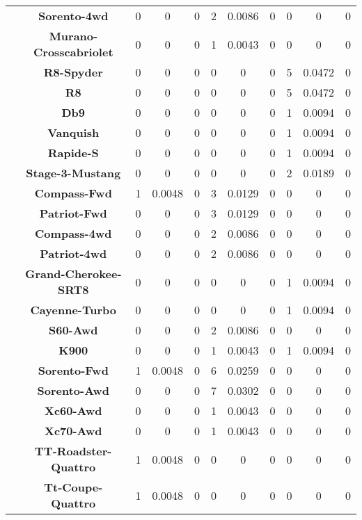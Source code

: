 \begin{center}
\begin{tabular}{|c|c||@{\hspace{1ex}}||c|c|c||@{\hspace{1ex}}||c|c|c||@{\hspace{1ex}}||c|c|c||@{\hspace{1ex}}||}
\cline{2-11}
  & {\bf Sorento-4wd} & 0 & 0 & 0 & 2 & 0.0086 & 0 & 0 & 0 & 0 \\
\cline{2-11}
  & {\bf Murano-Crosscabriolet} & 0 & 0 & 0 & 1 & 0.0043 & 0 & 0 & 0 & 0 \\
\cline{2-11}
  & {\bf R8-Spyder} & 0 & 0 & 0 & 0 & 0 & 0 & 5 & 0.0472 & 0 \\
\cline{2-11}
  & {\bf R8} & 0 & 0 & 0 & 0 & 0 & 0 & 5 & 0.0472 & 0 \\
\cline{2-11}
  & {\bf Db9} & 0 & 0 & 0 & 0 & 0 & 0 & 1 & 0.0094 & 0 \\
\cline{2-11}
  & {\bf Vanquish} & 0 & 0 & 0 & 0 & 0 & 0 & 1 & 0.0094 & 0 \\
\cline{2-11}
  & {\bf Rapide-S} & 0 & 0 & 0 & 0 & 0 & 0 & 1 & 0.0094 & 0 \\
\cline{2-11}
  & {\bf Stage-3-Mustang} & 0 & 0 & 0 & 0 & 0 & 0 & 2 & 0.0189 & 0 \\
\cline{2-11}
  & {\bf Compass-Fwd} & 1 & 0.0048 & 0 & 3 & 0.0129 & 0 & 0 & 0 & 0 \\
\cline{2-11}
  & {\bf Patriot-Fwd} & 0 & 0 & 0 & 3 & 0.0129 & 0 & 0 & 0 & 0 \\
\cline{2-11}
  & {\bf Compass-4wd} & 0 & 0 & 0 & 2 & 0.0086 & 0 & 0 & 0 & 0 \\
\cline{2-11}
  & {\bf Patriot-4wd} & 0 & 0 & 0 & 2 & 0.0086 & 0 & 0 & 0 & 0 \\
\cline{2-11}
  & {\bf Grand-Cherokee-SRT8} & 0 & 0 & 0 & 0 & 0 & 0 & 1 & 0.0094 & 0 \\
\cline{2-11}
  & {\bf Cayenne-Turbo} & 0 & 0 & 0 & 0 & 0 & 0 & 1 & 0.0094 & 0 \\
\cline{2-11}
  & {\bf S60-Awd} & 0 & 0 & 0 & 2 & 0.0086 & 0 & 0 & 0 & 0 \\
\cline{2-11}
  & {\bf K900} & 0 & 0 & 0 & 1 & 0.0043 & 0 & 1 & 0.0094 & 0 \\
\cline{2-11}
  & {\bf Sorento-Fwd} & 1 & 0.0048 & 0 & 6 & 0.0259 & 0 & 0 & 0 & 0 \\
\cline{2-11}
  & {\bf Sorento-Awd} & 0 & 0 & 0 & 7 & 0.0302 & 0 & 0 & 0 & 0 \\
\cline{2-11}
  & {\bf Xc60-Awd} & 0 & 0 & 0 & 1 & 0.0043 & 0 & 0 & 0 & 0 \\
\cline{2-11}
  & {\bf Xc70-Awd} & 0 & 0 & 0 & 1 & 0.0043 & 0 & 0 & 0 & 0 \\
\cline{2-11}
  & {\bf TT-Roadster-Quattro} & 1 & 0.0048 & 0 & 0 & 0 & 0 & 0 & 0 & 0 \\
\cline{2-11}
  & {\bf Tt-Coupe-Quattro} & 1 & 0.0048 & 0 & 0 & 0 & 0 & 0 & 0 & 0 \\

\end{tabular}
\end{center}
